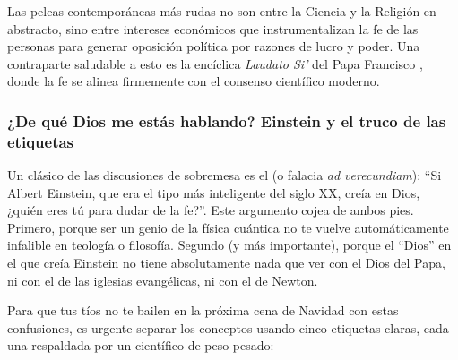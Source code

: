 \begin{remember}
	Las peleas contemporáneas más rudas no son entre la Ciencia y la Religión en abstracto, sino entre intereses económicos que instrumentalizan la fe de las personas para generar oposición política por razones de lucro y poder.
	Una contraparte saludable a esto es la encíclica \emph{Laudato Si'} del Papa Francisco \cite{Francisco2015}, donde la fe se alinea firmemente con el consenso científico moderno.
\end{remember}

\subsubsection*{¿De qué Dios me estás hablando? Einstein y el truco de las etiquetas}

Un clásico de las discusiones de sobremesa es el  (o falacia \emph{ad verecundiam}): “Si Albert Einstein, que era el tipo más inteligente del siglo XX, creía en Dios, ¿quién eres tú para dudar de la fe?”.
Este argumento cojea de ambos pies.
Primero, porque ser un genio de la física cuántica no te vuelve automáticamente infalible en teología o filosofía.
Segundo (y más importante), porque el “Dios” en el que creía Einstein no tiene absolutamente nada que ver con el Dios del Papa, ni con el de las iglesias evangélicas, ni con el de Newton.

Para que tus tíos no te bailen en la próxima cena de Navidad con estas confusiones, es urgente separar los conceptos usando cinco etiquetas claras, cada una respaldada por un científico de peso pesado:

